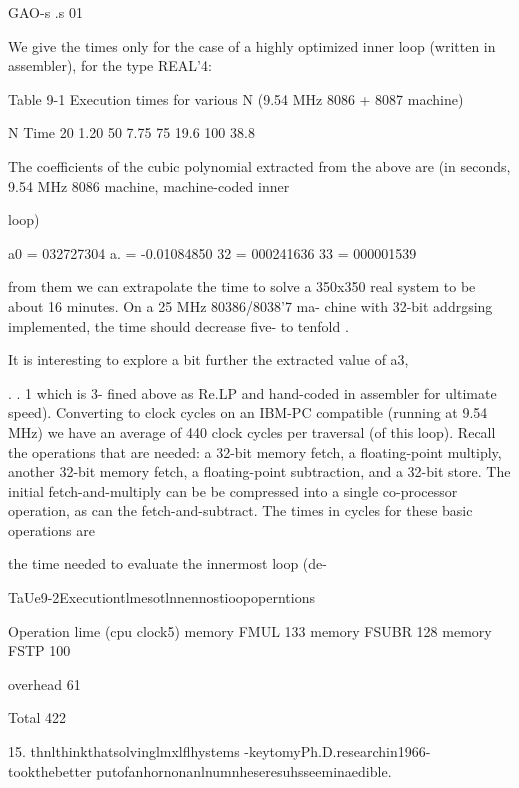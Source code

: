 {{{{{{{{GAO-s
.s
01

We give the times only for the case of a highly optimized inner
loop (written in assembler), for the type REAL'4:

 

Table 9-1 Execution times for various N (9.54 MHz 8086 + 8087 machine)

 

N Time
20 1.20
50 7.75
75 19.6
100 38.8

 

 

 

The coefficients of the cubic polynomial extracted from the above
are (in seconds, 9.54 MHz 8086 machine, machine-coded inner

loop)

a0 = 032727304
a. = -0.01084850
32 = 000241636
33 = 000001539

from them we can extrapolate the time to solve a 350x350 real
system to be about 16 minutes. On a 25 MHz 80386/8038'7 ma-
chine with 32-bit addrgsing implemented, the time should
decrease five- to tenfold .

It is interesting to explore a bit further the extracted value of a3,

. . 1
which is 3-
fined above as Re.LP and hand-coded in assembler for ultimate
speed). Converting to clock cycles on an IBM-PC compatible
(running at 9.54 MHz) we have an average of 440 clock cycles per
traversal (of this loop). Recall the operations that are needed: a
32-bit memory fetch, a floating-point multiply, another 32-bit
memory fetch, a floating-point subtraction, and a 32-bit store.
The initial fetch-and-multiply can be be compressed into a single
co-processor operation, as can the fetch-and-subtract. The times
in cycles for these basic operations are

the time needed to evaluate the innermost loop (de-

TaUe9-2Executiontlmesotlnnennostioopoperntions

 

Operation lime (cpu clock5)
memory FMUL 133
memory FSUBR 128
memory FSTP 100

overhead 61

 

Total 422

 

 

 

 

15. thnlthinkthatsolvinglmxlflhystems -keytomyPh.D.researchin1966- tookthebetter
putofanhornonanlnumnheseresuhsseeminaedible.

}}}}}}}}
